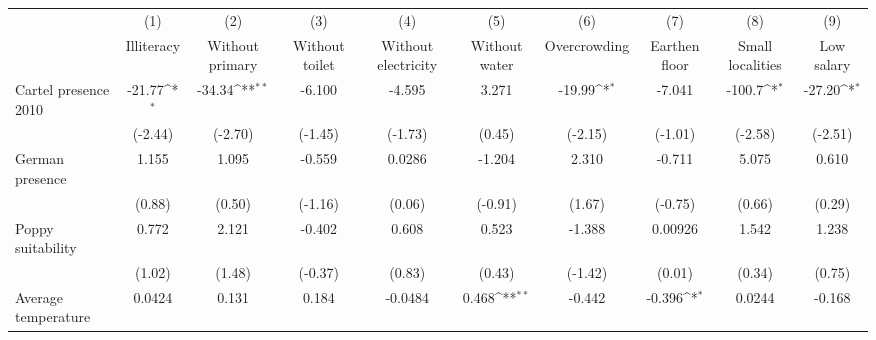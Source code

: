 {
\def\sym#1{\ifmmode^{#1}\else\(^{#1}\)\fi}
\begin{tabular}{l*{9}{c}}
\hline\hline
                    &\multicolumn{1}{c}{(1)}&\multicolumn{1}{c}{(2)}&\multicolumn{1}{c}{(3)}&\multicolumn{1}{c}{(4)}&\multicolumn{1}{c}{(5)}&\multicolumn{1}{c}{(6)}&\multicolumn{1}{c}{(7)}&\multicolumn{1}{c}{(8)}&\multicolumn{1}{c}{(9)}\\
                    &\multicolumn{1}{c}{Illiteracy}&\multicolumn{1}{c}{Without primary}&\multicolumn{1}{c}{Without toilet}&\multicolumn{1}{c}{Without electricity}&\multicolumn{1}{c}{Without water}&\multicolumn{1}{c}{Overcrowding}&\multicolumn{1}{c}{Earthen floor}&\multicolumn{1}{c}{Small localities}&\multicolumn{1}{c}{Low salary}\\
\hline
Cartel presence 2010&      -21.77\sym{*}  &      -34.34\sym{**} &      -6.100         &      -4.595         &       3.271         &      -19.99\sym{*}  &      -7.041         &      -100.7\sym{*}  &      -27.20\sym{*}  \\
                    &     (-2.44)         &     (-2.70)         &     (-1.45)         &     (-1.73)         &      (0.45)         &     (-2.15)         &     (-1.01)         &     (-2.58)         &     (-2.51)         \\
[1em]
German presence     &       1.155         &       1.095         &      -0.559         &      0.0286         &      -1.204         &       2.310         &      -0.711         &       5.075         &       0.610         \\
                    &      (0.88)         &      (0.50)         &     (-1.16)         &      (0.06)         &     (-0.91)         &      (1.67)         &     (-0.75)         &      (0.66)         &      (0.29)         \\
[1em]
Poppy suitability   &       0.772         &       2.121         &      -0.402         &       0.608         &       0.523         &      -1.388         &     0.00926         &       1.542         &       1.238         \\
                    &      (1.02)         &      (1.48)         &     (-0.37)         &      (0.83)         &      (0.43)         &     (-1.42)         &      (0.01)         &      (0.34)         &      (0.75)         \\
[1em]
Average temperature &      0.0424         &       0.131         &       0.184         &     -0.0484         &       0.468\sym{**} &      -0.442         &      -0.396\sym{*}  &      0.0244         &      -0.168         \\

\end{tabular}}
